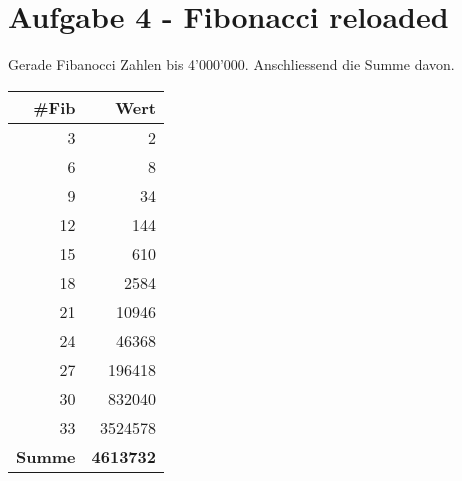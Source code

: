 \section*{Aufgabe 4 - Fibonacci reloaded}
Gerade Fibanocci Zahlen bis 4'000'000.
Anschliessend die Summe davon.

\begin{center}
\small\renewcommand{\arraystretch}{1.4}
\small
{} %
\begin{tabularx}{0.25\textwidth}{rr}
\rowcolor{tableheadcolor}
\hline
\textbf{\#Fib} & \textbf{Wert} \\
\hline
3 & 2 \\
6 & 8 \\
9 & 34 \\
12 & \num{144} \\
15 & \num{610} \\
18 & \num{2584} \\
21 & \num{10946} \\
24 & \num{46368} \\
27 & \num{196418} \\
30 & \num{832040} \\
33 & \num{3524578} \\
\hline
\rowcolor{tablesubheadcolor}
\textbf{Summe} & \textbf{\num{4613732}}\\
\hline
\end{tabularx}
\end{center}
